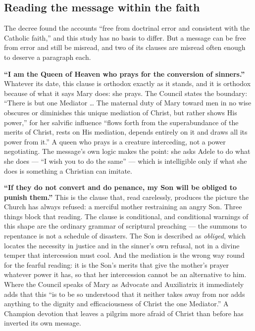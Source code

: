 \subsection{Reading the message within the faith}

The decree found the accounts ``free from doctrinal error and
consistent with the Catholic faith,'' and this study has no basis to
differ. But a message can be free from error and still be misread, and
two of its clauses are misread often enough to deserve a paragraph
each.

\textbf{``I am the Queen of Heaven who prays for the conversion of
sinners.''} Whatever its date, this clause is orthodox exactly as it
stands, and it is orthodox because of what it says Mary does: she
prays. The Council states the boundary: ``There is but one Mediator
\dots{} The maternal duty of Mary toward men in no wise obscures or
diminishes this unique mediation of Christ, but rather shows His
power,'' for her salvific influence ``flows forth from the
superabundance of the merits of Christ, rests on His mediation, depends
entirely on it and draws all its power from it.''
A queen who prays is a creature interceding, not a power negotiating.
The message's own logic makes the point: she asks Adele to do what she
does --- ``I wish you to do the same'' --- which is intelligible only
if what she does is something a Christian can imitate.

\textbf{``If they do not convert and do penance, my Son will be obliged
to punish them.''} This is the clause that, read carelessly, produces
the picture the Church has always refused: a merciful mother
restraining an angry Son. Three things block that reading. The clause
is conditional, and conditional warnings of this shape are the ordinary
grammar of scriptural preaching --- the summons to repentance is not a
schedule of disasters. The Son is described as \emph{obliged}, which
locates the necessity in justice and in the sinner's own refusal, not
in a divine temper that intercession must cool. And the mediation is
the wrong way round for the fearful reading: it is the Son's merits
that give the mother's prayer whatever power it has, so that her
intercession cannot be an alternative to him. Where the Council speaks
of Mary as Advocate and Auxiliatrix it immediately adds that this ``is
to be so understood that it neither takes away from nor adds anything
to the dignity and efficaciousness of Christ the one
Mediator.'' A Champion devotion that leaves a pilgrim
more afraid of Christ than before has inverted its own message.

